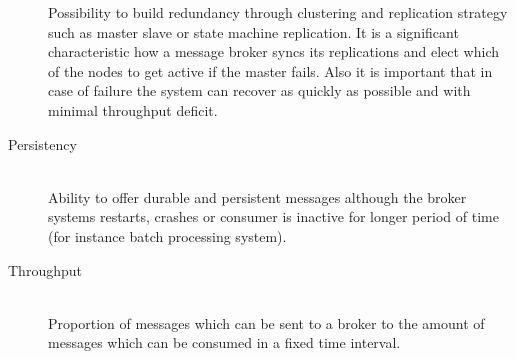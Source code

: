 \begin{description}
{            Possibility to build redundancy through clustering and
            replication strategy such as master slave or state machine
            replication. It is a significant characteristic how a
            message broker syncs its replications and elect which of the nodes
            to get active if the master fails. Also it is important that in case
            of failure the system can recover as quickly as possible and with
            minimal throughput deficit.   }
        \item [Persistency] \hfill \\ 
        {Ability to offer durable and persistent messages although the broker
            systems restarts, crashes or consumer is inactive for longer period of time
            (for instance batch processing system). }
    \item [Throughput] \hfill \\
        {Proportion of messages which can be sent to a broker to the amount of
        messages which can be consumed in a fixed time interval.}
\end{description}



